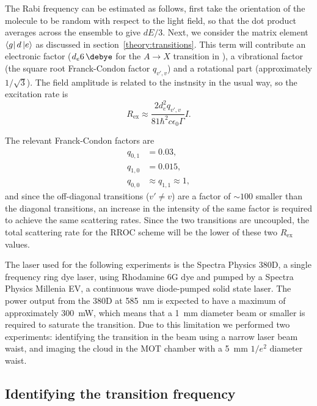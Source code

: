 The Rabi frequency can be estimated as follows, first take the orientation of
the molecule to be random with respect to the light field, so that the dot
product averages across the ensemble to give $dE/3$. Next, we consider the
matrix element $\bra{g}d\ket{e}$ as discussed in
section~\ref{theory:transitions}.  This term will contribute an electronic
factor ($d_e\SI{6}{\debye}$ for the $A\rightarrow X$ transition in \CaF{}), a
vibrational factor (the square root Franck-Condon factor $q_{v',v}$) and a
rotational part (approximately $1/\sqrt{3}$). The field amplitude is related to
the instnsity in the usual way, so the excitation rate is
%
\begin{equation}
  R_\text{ex} \approx \frac{2 d_e^2 q_{v',v}}{81 \hbar^2 c \epsilon_0 \Gamma}I.
\end{equation}

The relevant Franck-Condon factors are
%
\begin{align}
  q_{0,1} &= 0.03,\\
  q_{1,0} &= 0.015,\\
  q_{0,0} &\approx q_{1,1} \approx 1,
\end{align}
%
and since the off-diagonal transitions ($v' \neq v$) are a factor of $\sim100$
smaller than the diagonal transitions, an increase in the intensity of the same
factor is required to achieve the same scattering rates. Since the two
transitions are uncoupled, the total scattering rate for the RROC scheme will
be the lower of these two $R_\text{ex}$ values.

The  laser used for the following experiments is the Spectra
Physics 380D, a single frequency ring dye laser, using Rhodamine 6G dye and
pumped by a Spectra Physics Millenia EV, a continuous wave diode-pumped solid
state laser. The power output from the 380D at \SI{585}{\nano\meter} is
expected to have a maximum of approximately \SI{300}{\milli\watt}, which means
that a \SI{1}{\milli\meter} diameter beam or smaller is required to saturate
the transition.  Due to this limitation we performed two experiments:
identifying the transition in the \CaF{} beam using a narrow laser beam waist,
and imaging the \CaF{} cloud in the MOT chamber with a \SI{5}{\milli\meter}
$1/e^2$ diameter waist.

\subsection{Identifying the transition frequency}

